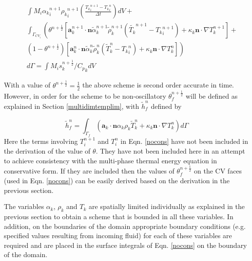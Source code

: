 \begin{eqnarray}
&&\int M_{i} {\alpha_k}_i^{n+1} {\rho_k}_{i}^{n+1} \left(
\frac{{T_k}_{i}^{n+1}-{T_k}_{i}^{n}}{\Delta t} \right)  dV +
\nonumber\\
&&\int_{\Gamma_{CV_{i}}} \left(\theta^{n+\frac{1}{2}} \left[
\mathbf{a}^{n+1}_k \cdot \mathbf{n} {\widetilde{\alpha}}_k^{n+1}
{\widetilde{\rho}}_k^{n+1} (\widetilde{T_k}^{n+1}-{T_k}_i^{n+1})
+\kappa_k \mathbf{n}\cdot \nabla T^{n+1}_k \right]\right. +\nonumber\\
&&\left.(1-\theta^{n+\frac{1}{2}} )\left[ \mathbf{a}^{n}_k \cdot
\mathbf{n} {\widetilde{\alpha}}_k^{n} {\widetilde{\rho}}_k^{n}
(\widetilde{T}^{n}_k-{T_k}_i^{n}) +\kappa_k \mathbf{n}\cdot \nabla
T^{n}_k \right]\right)\nonumber\\
&&d\Gamma = \int M_{i} s_k^{n+\frac{1}{2}}/{C_p}_k dV
\label{nocons}
\end{eqnarray}


With a value of $\theta^{n+\frac{1}{2}}={\frac{1}{2}}$ the above scheme is second order accurate in time. However, in order for the scheme to be non-oscillatory $\theta_{f}^{n+\frac{1}{2}}$ will be defined as explained in Section \ref{multidimtemplim}, with $\tilde{h}^{n}_{f}$ defined by

\begin{equation}
\tilde{h}^{n}_{f}=\int_{\Gamma_{f}}
\left(\mathbf{a}_k\cdot \mathbf{n}\alpha_k \rho_k \widetilde{T}^{n}_k
+\kappa_k \mathbf{n}\cdot \nabla  T^{n}_k  \right)d\Gamma
\end{equation}
Here the terms involving $T_i^{n+1}$ and $T_i^n$ in Eqn. \ref{nocons} have not been included in the derivation of the value of $\theta$. They have not been included here in an attempt to achieve consistency with the multi-phase thermal energy equation in conservative form. If they are included then the values of $\theta_f^{n+\frac{1}{2}}$ on the CV faces (used in Eqn. \ref{nocons}) can be easily derived based on the derivation in the previous section.

The variables $\alpha_k$, $\rho_k$ and $T_k$ are spatially limited individually as explained in the previous section to obtain a scheme that is bounded in all these variables. In addition, on the boundaries of the domain appropriate boundary conditions (e.g. specified values resulting from incoming fluid) for each of these variables are required and are placed in the surface integrals of Eqn. \ref{nocons} on the boundary of the domain.


